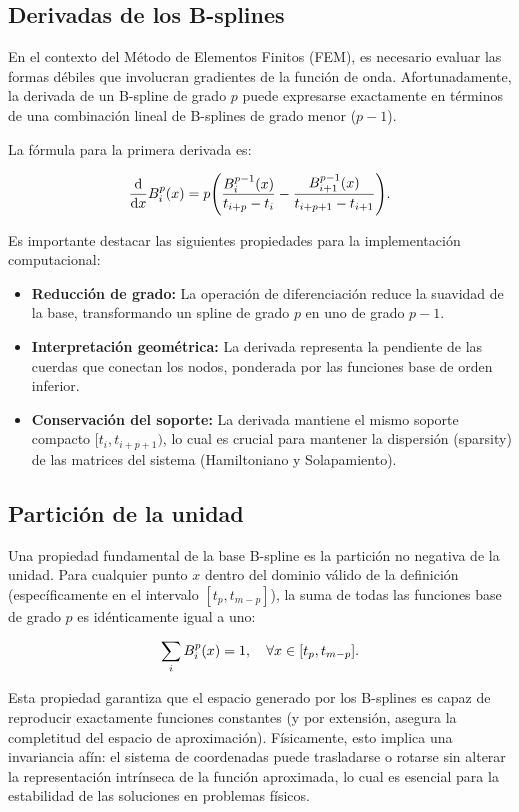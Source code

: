\documentclass[12pt, a4paper, oneside, spanish]{book}
\begin{document}
\subsection{Derivadas de los B-splines}

En el contexto del Método de Elementos Finitos (FEM), es necesario evaluar las formas débiles que involucran gradientes de la función de onda. Afortunadamente, la derivada de un B-spline de grado \( p \) puede expresarse exactamente en términos de una combinación lineal de B-splines de grado menor (\( p-1 \)).

La fórmula para la primera derivada es:

\[ \dv{x} B_i^p(x) = p \qty( \frac{B_i^{p-1}(x)}{t_{i+p}-t_i} - \frac{B_{i+1}^{p-1}(x)}{t_{i+p+1}-t_{i+1}} ). \]

Es importante destacar las siguientes propiedades para la implementación computacional:
\begin{itemize}
\item \textbf{Reducción de grado:} La operación de diferenciación reduce la suavidad de la base, transformando un spline de grado \( p \) en uno de grado \( p-1 \).
\item \textbf{Interpretación geométrica:} La derivada representa la pendiente de las cuerdas que conectan los nodos, ponderada por las funciones base de orden inferior.
\item \textbf{Conservación del soporte:} La derivada mantiene el mismo soporte compacto \( [t_i, t_{i+p+1}) \), lo cual es crucial para mantener la dispersión (sparsity) de las matrices del sistema (Hamiltoniano y Solapamiento).
\end{itemize}

\subsection{Partición de la unidad}

Una propiedad fundamental de la base B-spline es la partición no negativa de la unidad. Para cualquier punto \( x \) dentro del dominio válido de la definición (específicamente en el intervalo \( [t_p,t_{m-p}] \)), la suma de todas las funciones base de grado \( p \) es idénticamente igual a uno:

\begin{equation}
  \label{eq:part-unity}
  \sum_{i}B_i^p(x) = 1 \qc \forall x \in [t_p, t_{m-p}].
\end{equation}

Esta propiedad garantiza que el espacio generado por los B-splines es capaz de reproducir exactamente funciones constantes (y por extensión, asegura la completitud del espacio de aproximación). Físicamente, esto implica una invariancia afín: el sistema de coordenadas puede trasladarse o rotarse sin alterar la representación intrínseca de la función aproximada, lo cual es esencial para la estabilidad de las soluciones en problemas físicos.
\end{document}
